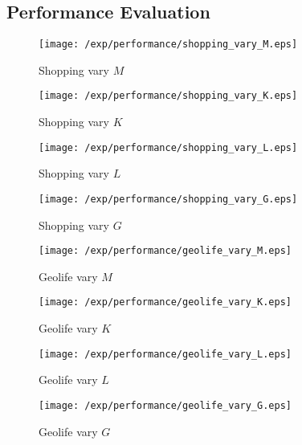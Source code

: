 \subsection{Performance Evaluation}
\begin{figure*}[t]
\centering
    \begin{subfigure}[b]{0.23\textwidth}
        \texttt{[image: /exp/performance/shopping\_vary\_M.eps]}
        \caption{Shopping vary $M$}
    \end{subfigure}
    \begin{subfigure}[b]{0.23\textwidth}
        \texttt{[image: /exp/performance/shopping\_vary\_K.eps]}
        \caption{Shopping vary $K$}
    \end{subfigure}
    \begin{subfigure}[b]{0.23\textwidth}
        \texttt{[image: /exp/performance/shopping\_vary\_L.eps]}
        \caption{Shopping vary $L$}
    \end{subfigure}
       \begin{subfigure}[b]{0.23\textwidth}
        \texttt{[image: /exp/performance/shopping\_vary\_G.eps]}
        \caption{Shopping vary $G$}
    \end{subfigure}

	\begin{subfigure}[b]{0.23\textwidth}
        \texttt{[image: /exp/performance/geolife\_vary\_M.eps]}
        \caption{Geolife vary $M$}
    \end{subfigure}
    \begin{subfigure}[b]{0.23\textwidth}
        \texttt{[image: /exp/performance/geolife\_vary\_K.eps]}
        \caption{Geolife vary $K$}
    \end{subfigure}
    \begin{subfigure}[b]{0.23\textwidth}
        \texttt{[image: /exp/performance/geolife\_vary\_L.eps]}
        \caption{Geolife vary $L$}
    \end{subfigure}
       \begin{subfigure}[b]{0.23\textwidth}
        \texttt{[image: /exp/performance/geolife\_vary\_G.eps]}
        \caption{Geolife vary $G$}
    \end{subfigure}
    

\end{figure*}
